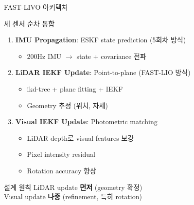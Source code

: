 \begin{frame}{FAST-LIVO 아키텍처}
  \begin{block}{세 센서 순차 통합}
    \begin{enumerate}
      \item \textbf{IMU Propagation}: ESKF state prediction (5회차 방식)
        \begin{itemize}
          \item 200Hz IMU $\to$ state + covariance 전파
        \end{itemize}
      \item \textbf{LiDAR IEKF Update}: Point-to-plane (FAST-LIO 방식)
        \begin{itemize}
          \item ikd-tree + plane fitting + IEKF
          \item Geometry 추정 (위치, 자세)
        \end{itemize}
      \item \textbf{Visual IEKF Update}: Photometric matching
        \begin{itemize}
          \item LiDAR depth로 visual features 보강
          \item Pixel intensity residual
          \item Rotation accuracy 향상
        \end{itemize}
    \end{enumerate}
  \end{block}
  \pause
  \begin{alertblock}{설계 원칙}
    LiDAR update \textbf{먼저} (geometry 확정)\\
    Visual update \textbf{나중} (refinement, 특히 rotation)
  \end{alertblock}
\end{frame}

